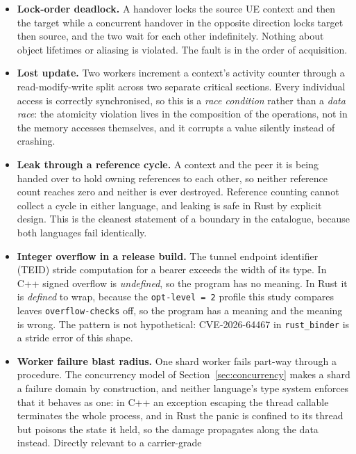 \documentclass[english,oneside,a4paper,censored,csm,software-track-2020]{HYthesisML}
\begin{document}
\begin{itemize}
  \item \textbf{Lock-order deadlock.} A handover locks the source UE context and then the
        target while a concurrent handover in the opposite direction locks target then source,
        and the two wait for each other indefinitely. Nothing about object lifetimes or
        aliasing is violated. The fault is in the order of acquisition.
  \item \textbf{Lost update.} Two workers increment a context's activity counter through a
        read-modify-write split across two separate critical sections. Every individual access
        is correctly synchronised, so this is a \emph{race condition} rather than a
        \emph{data race}: the atomicity violation lives in the composition of the operations,
        not in the memory accesses themselves, and it corrupts a value silently instead of
        crashing.
  \item \textbf{Leak through a reference cycle.} A context and the peer it is being handed
        over to hold owning references to each other, so neither reference count reaches zero
        and neither is ever destroyed. Reference counting cannot collect a cycle in either
        language, and leaking is safe in Rust by explicit design. This is the cleanest
        statement of a boundary in the catalogue, because both languages fail identically.
  \item \textbf{Integer overflow in a release build.} The tunnel endpoint identifier (TEID)
        stride computation for a bearer
        exceeds the width of its type. In C++ signed overflow is \emph{undefined}, so the
        program has no meaning. In Rust it is \emph{defined} to wrap, because the
        \texttt{opt-level~=~2} profile this study compares leaves \texttt{overflow-checks}
        off, so the program has a meaning and the meaning is wrong. The pattern is not
        hypothetical: CVE-2026-64467 in \texttt{rust\_binder} is a stride error of this shape.
  \item \textbf{Worker failure blast radius.} One shard worker fails part-way through a
        procedure. The concurrency model of Section~\ref{sec:concurrency} makes a shard
        a failure domain by construction, and neither language's type system enforces that it
        behaves as one: in C++ an exception escaping the thread callable terminates the whole
        process, and in Rust the panic is confined to its thread but poisons the state it held,
        so the damage propagates along the data instead. Directly relevant to a carrier-grade

\end{itemize}
\end{document}
